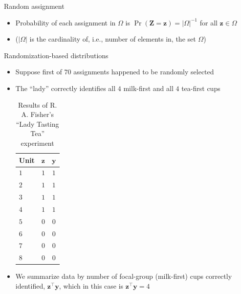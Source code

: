 \documentclass[table, xcolor = {dvipsnames}, 9pt]{beamer}
\theoremstyle{plain}
\begin{document}
\begin{frame}{Random assignment}
\begin{itemize}
\begin{itemize}
\begin{equation}
\begin{bmatrix} 0 \\ 0 \\ 0 \\ 0 \\ 1 \\ 1 \\ 1 \\ 1 \end{bmatrix}
\right\}
\end{equation} \vspace{1em}
\item Probability of each assignment in $\Omega$ is $\Pr\left(\mathbf{Z} = \mathbf{z} \right) = \left\lvert \Omega \right\rvert^{-1}$ for all $\bm{z} \in \Omega$  \vfill
\item[] ($\left\lvert \Omega \right\rvert$ is the cardinality of, i.e., number of elements in, the set $\Omega$) \vfill
\end{itemize} \vfill
\end{itemize} \vfill
\end{frame}
\begin{frame}{Randomization-based distributions}
\vfill
\begin{itemize}
\item Suppose first of $70$ assignments happened to be randomly selected \vfill 
\item The ``lady'' correctly identifies all $4$ milk-first and all $4$ tea-first cups \vfill
\vspace{1em}
\begin{table}[H]
\centering
\begin{tabular}{l|cc}
\toprule
Unit & $\bm{z}$ & $\bm{y}$ \\ 
  \midrule
$1$ & $1$ & $1$  \\ 
$2$ & $1$ & $1$  \\ 
$3$ & $1$ & $1$  \\ 
$4$ & $1$ & $1$  \\ 
$5$ & $0$ & $0$  \\ 
$6$ & $0$ & $0$  \\ 
$7$ & $0$ & $0$ \\ 
$8$ & $0$ & $0$ 
\end{tabular}
\caption{Results of R. A. Fisher's ``Lady Tasting Tea'' experiment}
\label{tab: lady tasting tea obs data}
\end{table}
\vspace{-2em}
\vfill
\item We summarize data by number of focal-group (milk-first) cups correctly identified, $\mathbf{z}^{\top}\mathbf{y}$, which in this case is $\mathbf{z}^{\top}\mathbf{y} = 4$ \vfill
\end{itemize} \vfill
\end{frame}
\end{document}
